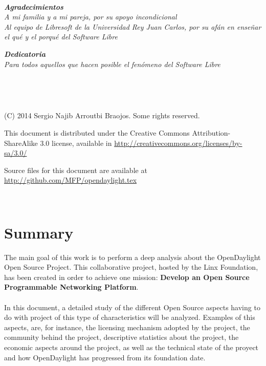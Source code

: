 \documentclass[a4paper, 12pt]{book}
\begin{document}
\newpage
~
\thispagestyle{empty}
\vspace{3cm}
\begin{flushright}
\textbf{\textit{Agradecimientos}} \\
\textit{A mi familia y a mi pareja, por su apoyo incondicional\\
Al equipo de Libresoft de la Universidad Rey Juan Carlos,
por su afán en enseñar el qué y el porqué del Software Libre}
\vspace{2cm}

\textbf{\textit{Dedicatoria}} \\
\textit{Para todos aquellos que hacen posible el fenómeno del Software Libre}
\end{flushright}

\newpage
~


\newpage
~
\thispagestyle{empty}
\vspace{12cm}
\begin{flushright}

(C) 2014 Sergio Najib Arroutbi Braojos. Some rights reserved.

This document is distributed under the Creative Commons
Attribution-ShareAlike 3.0 license,
available in \url{http://creativecommons.org/licenses/by-sa/3.0/}

Source files for this document are available at
\url{http://github.com/MFP/opendaylight.tex}
\end{flushright}

\newpage
~

\tableofcontents

\listoffigures

\listoftables


\chapter*{Summary}
\label{chap:summary}

The main goal of this work is to perform a deep analysis about the OpenDaylight Open Source Project. This collaborative project, hosted by the Linx Foundation, has been created in order to achieve one mission: \textbf{Develop an Open Source Programmable Networking Platform}.\\
\\
In this document, a detailed study of the different Open Source aspects having to do with project of this type of characteristics will be analyzed. Examples of this aspects, are, for instance, the licensing mechanism adopted by the project, the community behind the project, descriptive statistics about the project, the economic aspects around the project, as well as the technical state of the proyect and how OpenDaylight has progressed from its foundation date.
\end{document}
